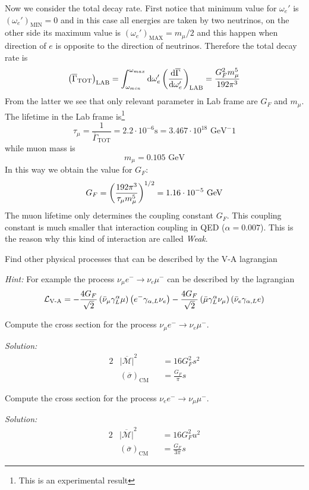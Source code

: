 \documentclass[TheoreticalPhy_ModB.tex]{subfiles}
\begin{document}
Now we consider the total decay rate. First notice that minimum value for $\omega_e'$ is $(\omega_e')_{\text{MIN}}=0$ and in this case all energies are taken by two neutrinos, on the other side its maximum value is $(\omega_e')_{\text{MAX}}=m_\mu/2$ and this happen when direction of $e$ is opposite to the direction of neutrinos. Therefore the total decay rate is
\[\left(\overline{\Gamma}_{\text{TOT}}\right)_{\text{LAB}}=\int_{\omega_{min}}^{\omega_{max}}\textup{d}\omega_e'\left(\frac{\textup{d}\overline\Gamma}{\textup{d}\omega_e'}\right)_{\text{LAB}}
=\frac{G_F^2m_\mu^5}{192\pi^3}\]
From the latter we see that only relevant parameter in Lab frame are $G_F$ and $m_\mu$. The lifetime in the Lab frame is\footnote{This is an experimental result}
\[\tau_\mu=\frac1{\overline\Gamma_{\text{TOT}}}=2.2\cdot 10^{-6}\text{s}
=3.467\cdot 10^{18}\text{ GeV}^-1\]
while muon mass is 
\[m_\mu=0.105\text{ GeV}\]
In this way we obtain the value for $G_F$:
\[G_F=\left(\frac{192\pi^3}{\tau_\mu m_\mu^5}\right)^{1/2}=1.16\cdot 10^{-5}\text{ GeV}\]
The muon lifetime only determines the coupling constant $G_F$.
This coupling constant is much smaller that interaction coupling in QED ($\alpha=0.007$). This is the reason why this kind of interaction are called \emph{Weak}.

\begin{exercise}
Find other physical processes that can be described by the V-A lagrangian

\skipline
\textit{Hint:}
For example the process $\nu_\mu e^-\to\nu_e\mu^-$ can be described by the lagrangian
\[\mathcal L_{\text{V-A}}=-\frac{4G_F}{\sqrt2}\left(\bar\nu_\mu\gamma^\alpha_L\mu\right)\left(e^-\gamma_{\alpha,L}\nu_e\right)-\frac{4G_F}{\sqrt2}\left(\bar\mu\gamma^\alpha_L\nu_\mu\right)\left(\bar\nu_e\gamma_{\alpha,L}e\right)\]
\end{exercise}


\begin{exercise}
Compute the cross section for the process $\nu_\mu e^-\to\nu_e\mu^-$.

\skipline
\textit{Solution:}
\begin{alignat*}{2}
&\overline{|\mathcal M|}^2&&=16G_F^2s^2\\
&(\overline\sigma)_{\text{CM}}&&=\frac{G_F}{\pi}s
\end{alignat*}
\end{exercise}

\begin{exercise}
Compute the cross section for the process $\nu_e e^-\to\nu_\mu\mu^-$.

\skipline
\textit{Solution:}
\begin{alignat*}{2}
&\overline{|\mathcal M|}^2&&=16G_F^2u^2\\
&(\overline\sigma)_{\text{CM}}&&=\frac{G_F}{3\pi}s
\end{alignat*}
\end{exercise}
\end{document}
